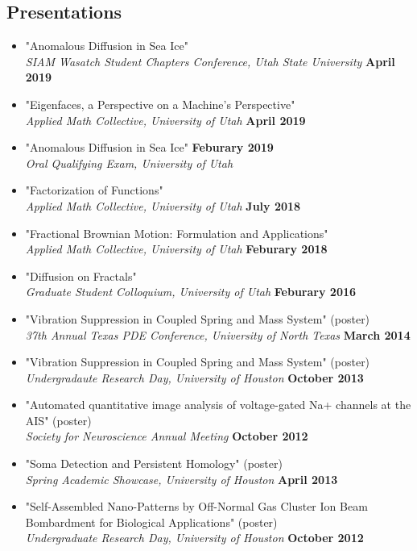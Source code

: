 \documentclass[margin,line]{res}
\begin{document}
\begin{resume}
\section{\sc Presentations}
\begin{itemize}
    \item[] "Anomalous Diffusion in Sea Ice"
        \\{\it SIAM Wasatch Student Chapters Conference, Utah State University} \hfill {\bf April 2019} 
    \item[] "Eigenfaces, a Perspective on a Machine's Perspective"
        \\{\it Applied Math Collective, University of Utah} \hfill {\bf April 2019}
    \item[] "Anomalous Diffusion in Sea Ice" \hfill {\bf Feburary 2019} 
        \\ {\it Oral Qualifying Exam, University of Utah }
    \item[] "Factorization of Functions" 
        \\ {\it Applied Math Collective, University of Utah } \hfill {\bf July 2018} 
    \item[] "Fractional Brownian Motion: Formulation and Applications"
        \\ {\it Applied Math Collective, University of Utah} \hfill {\bf Feburary 2018} 
    \item[] "Diffusion on Fractals"
        \\ {\it Graduate Student Colloquium, University of Utah} \hfill {\bf Feburary 2016} 
    \item[] "Vibration Suppression in Coupled Spring and Mass System" (poster)
        \\ {\it 37th Annual Texas PDE Conference, University of North Texas} \hfill {\bf March 2014} 
    \item[] "Vibration Suppression in Coupled Spring and Mass System" (poster)
        \\ {\it Undergradaute Research Day, University of Houston} \hfill {\bf October 2013} 
    \item[] "Automated quantitative image analysis of voltage-gated Na+ channels at the AIS" (poster) 
    \\ {\it Society for Neuroscience Annual Meeting} \hfill {\bf October 2012} 
    \item[] "Soma Detection and Persistent Homology" (poster) 
    \\ {\it Spring Academic Showcase, University of Houston} \hfill {\bf April 2013} 
    \item[] "Self-Assembled Nano-Patterns by Off-Normal Gas Cluster Ion Beam Bombardment for Biological Applications" (poster) 
    \\ {\it Undergraduate Research Day, University of Houston} \hfill {\bf October 2012} 
\end{itemize}


\end{resume}
\end{document}
